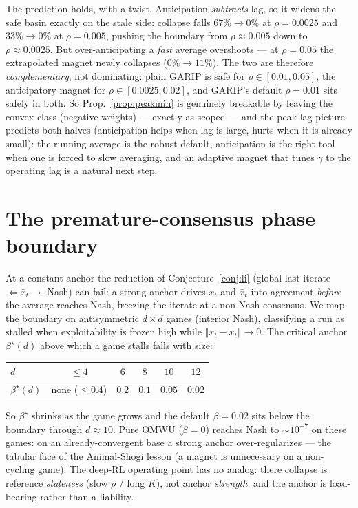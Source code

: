 \documentclass[10pt,twocolumn]{article}
\theoremstyle{plain}
\theoremstyle{remark}
\begin{document}
The prediction holds, with a twist. Anticipation \emph{subtracts} lag, so it widens
the safe basin exactly on the stale side: collapse falls $67\%\!\to\!0\%$ at
$\rho{=}0.0025$ and $33\%\!\to\!0\%$ at $\rho{=}0.005$, pushing the boundary from
$\rho\!\approx\!0.005$ down to $\rho\!\approx\!0.0025$. But over-anticipating a
\emph{fast} average overshoots --- at $\rho{=}0.05$ the extrapolated magnet newly
collapses ($0\%\!\to\!11\%$). The two are therefore \emph{complementary}, not
dominating: plain GARIP is safe for $\rho\!\in\![0.01,0.05]$, the anticipatory magnet
for $\rho\!\in\![0.0025,0.02]$, and GARIP's default $\rho{=}0.01$ sits safely in
both. So Prop.~\ref{prop:peakmin} is genuinely breakable by leaving the convex class
(negative weights) --- exactly as scoped --- and the peak-lag picture predicts both halves
(anticipation helps when lag is large, hurts when it is already small): the running
average is the robust default, anticipation is the right tool when one is forced to
slow averaging, and an adaptive magnet that tunes $\gamma$ to the operating lag is a
natural next step.

\section{The premature-consensus phase boundary}
\label{app:phase}
At a constant anchor the reduction of Conjecture~\ref{conj:li} (global last iterate
$\Leftarrow\bar x_t\!\to$ Nash) can fail: a strong anchor drives $x_t$ and $\bar x_t$
into agreement \emph{before} the average reaches Nash, freezing the iterate at a
non-Nash consensus. We map the boundary on antisymmetric $d\times d$ games (interior
Nash), classifying a run as stalled when exploitability is frozen high while
$\Vert x_t-\bar x_t\Vert\!\to\!0$. The critical anchor $\beta^\star(d)$ above which a
game stalls falls with size:
\begin{center}
\begin{tabular}{lccccc}
\toprule
$d$ & $\le 4$ & $6$ & $8$ & $10$ & $12$ \\
\midrule
$\beta^\star(d)$ & none ($\le0.4$) & $0.2$ & $0.1$ & $0.05$ & $0.02$ \\
\bottomrule
\end{tabular}
\end{center}
So $\beta^\star$ shrinks as the game grows and the default $\beta\!=\!0.02$ sits below
the boundary through $d\!\approx\!10$. Pure OMWU ($\beta\!=\!0$) reaches Nash to
$\sim\!10^{-7}$ on these games: on an already-convergent base a strong anchor
over-regularizes --- the tabular face of the Animal-Shogi lesson (a magnet is
unnecessary on a non-cycling game). The deep-RL operating point has no analog: there
collapse is reference \emph{staleness} (slow $\rho$ / long $K$), not anchor
\emph{strength}, and the anchor is load-bearing rather than a liability.
\end{document}
